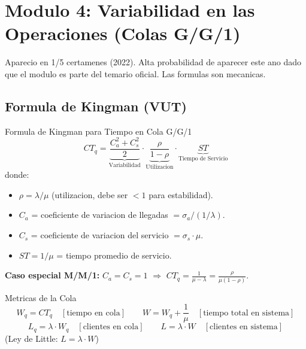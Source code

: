 \documentclass[11pt, a4paper]{article}
\begin{document}
\section[Modulo 4: Variabilidad y Colas G/G/1]{Modulo 4: Variabilidad en las Operaciones (Colas G/G/1)}

Aparecio en 1/5 certamenes (2022). Alta probabilidad de aparecer este ano dado que
el modulo es parte del temario oficial. Las formulas son mecanicas.

\subsection{Formula de Kingman (VUT)}

\begin{formulas}{Formula de Kingman para Tiempo en Cola G/G/1}
  \[
    CT_q = \underbrace{\frac{C_a^2 + C_s^2}{2}}_{\text{Variabilidad}}
           \cdot \underbrace{\frac{\rho}{1 - \rho}}_{\text{Utilizacion}}
           \cdot \underbrace{ST}_{\text{Tiempo de Servicio}}
  \]
  donde:
  \begin{itemize}[leftmargin=1.5em, itemsep=2pt]
    \item $\rho = \lambda / \mu$ (utilizacion, debe ser $< 1$ para estabilidad).
    \item $C_a$ = coeficiente de variacion de llegadas $ = \sigma_a / (1/\lambda)$.
    \item $C_s$ = coeficiente de variacion del servicio $ = \sigma_s \cdot \mu$.
    \item $ST = 1/\mu$ = tiempo promedio de servicio.
  \end{itemize}

  \medskip
  \textbf{Caso especial M/M/1:} $C_a = C_s = 1$ $\Rightarrow$
  $CT_q = \frac{1}{\mu - \lambda} = \frac{\rho}{\mu(1-\rho)}$.
\end{formulas}

\begin{formulas}{Metricas de la Cola}
  \[
    W_q = CT_q \quad [\text{tiempo en cola}]
    \qquad
    W = W_q + \frac{1}{\mu} \quad [\text{tiempo total en sistema}]
  \]
  \[
    L_q = \lambda \cdot W_q \quad [\text{clientes en cola}]
    \qquad
    L = \lambda \cdot W \quad [\text{clientes en sistema}]
  \]
  (Ley de Little: $L = \lambda \cdot W$)
\end{formulas}

\end{document}
